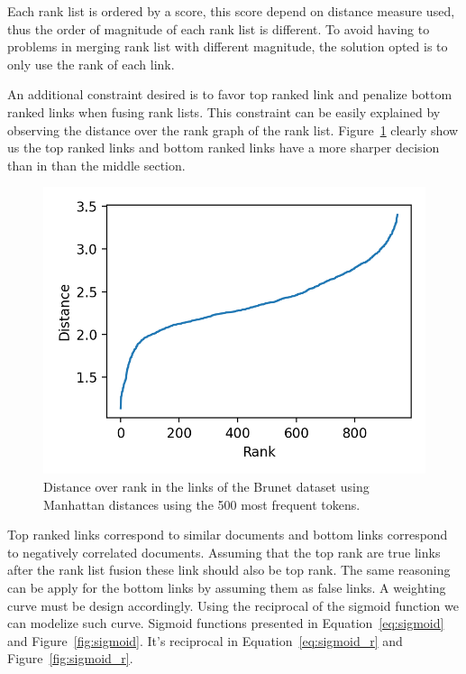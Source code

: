 Each rank list is ordered by a score, this score depend on distance measure used, thus the order of magnitude of each rank list is different.
To avoid having to problems in merging rank list with different magnitude, the solution opted is to only use the rank of each link.

An additional constraint desired is to favor top ranked link and penalize bottom ranked links when fusing rank lists.
This constraint can be easily explained by observing the distance over the rank graph of the rank list.
Figure~\ref{fig:distance_over_rank} clearly show us the top ranked links and bottom ranked links have a more sharper decision than in than the middle section.

\begin{figure}
  \includegraphics[width=\linewidth]{img/distance_over_rank.png}
  \caption{Distance over rank in the links of the Brunet dataset using Manhattan distances using the 500 most frequent tokens.}
  \label{fig:distance_over_rank}
\end{figure}

Top ranked links correspond to similar documents and bottom links correspond to negatively correlated documents.
Assuming that the top rank are true links after the rank list fusion these link should also be top rank.
The same reasoning can be apply for the bottom links by assuming them as false links.
A weighting curve must be design accordingly.
Using the reciprocal of the sigmoid function we can modelize such curve.
Sigmoid functions presented in Equation~\ref{eq:sigmoid} and Figure~\ref{fig:sigmoid}.
It's reciprocal in Equation~\ref{eq:sigmoid_r} and Figure~\ref{fig:sigmoid_r}.

